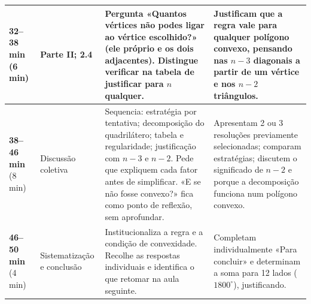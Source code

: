 \begin{longtable}{|p{1.35cm}|p{2.25cm}|p{5.55cm}|p{5.1cm}|}
\textbf{32--38 min} (6 min)&Parte II; 2.4&Pergunta «Quantos vértices não podes ligar ao vértice escolhido?» (ele próprio e os dois adjacentes). Distingue verificar na tabela de justificar para $n$ qualquer.&Justificam que a regra vale para qualquer polígono convexo, pensando nas $n-3$ diagonais a partir de um vértice e nos $n-2$ triângulos.\\\hline
\textbf{38--46 min} (8 min)&Discussão coletiva&Sequencia: estratégia por tentativa; decomposição do quadrilátero; tabela e regularidade; justificação com $n-3$ e $n-2$. Pede que expliquem cada fator antes de simplificar. «E se não fosse convexo?» fica como ponto de reflexão, sem aprofundar.&Apresentam 2 ou 3 resoluções previamente selecionadas; comparam estratégias; discutem o significado de $n-2$ e porque a decomposição funciona num polígono convexo.\\\hline
\textbf{46--50 min} (4 min)&Sistematização e conclusão&Institucionaliza a regra e a condição de convexidade. Recolhe as respostas individuais e identifica o que retomar na aula seguinte.&Completam individualmente «Para concluir» e determinam a soma para 12 lados ($1800^\circ$), justificando.\\\hline
\end{longtable}
\endgroup

